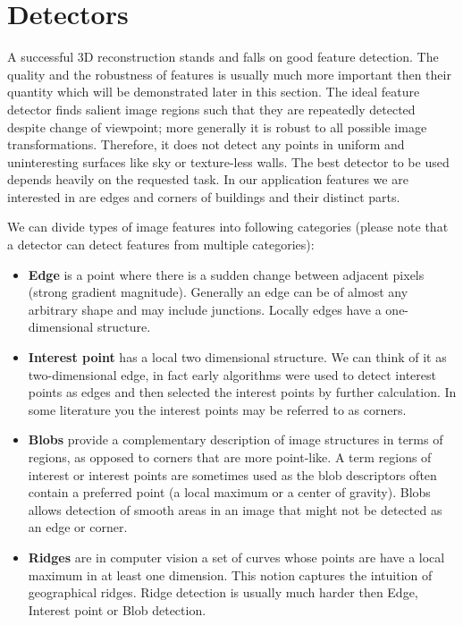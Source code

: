 \section{Detectors}
\label{sec:detectors}
A successful 3D reconstruction stands and falls on good feature detection. The quality and the robustness of features is usually much more important then their quantity which will be demonstrated later in this section. The ideal feature detector finds salient image regions such that they are repeatedly detected despite change of viewpoint; more generally it is robust to all possible image transformations. Therefore, it does not detect any points in uniform and uninteresting surfaces like sky or texture-less walls. The best detector to be used depends heavily on the requested task. In our application features we are interested in are edges and corners of buildings and their distinct parts.

We can divide types of image features into following categories (please note that a detector can detect features from multiple categories):
\begin{itemize}
	\item \textbf{Edge} is a point where there is a sudden change between adjacent pixels (strong gradient magnitude). Generally an edge can be of almost any arbitrary shape and may include junctions. Locally edges have a one-dimensional structure.
	\item \textbf{Interest point} has a local two dimensional structure. We can think of it as two-dimensional edge, in fact early algorithms were used to detect interest points as edges and then selected the interest points by further calculation. In some literature you the interest points may be referred to as corners.
	\item \textbf{Blobs} provide a complementary description of image structures in terms of regions, as opposed to corners that are more point-like. A term regions of interest or interest points are sometimes used as the blob descriptors often contain a preferred point (a local maximum or a center of gravity). Blobs allows detection of smooth areas in an image that might not be detected as an edge or corner.
	\item \textbf{Ridges} are in computer vision a set of curves whose points are have a local maximum in at least one dimension. This notion captures the intuition of geographical ridges. Ridge detection is usually much harder then Edge, Interest point or Blob detection.
\end{itemize}

